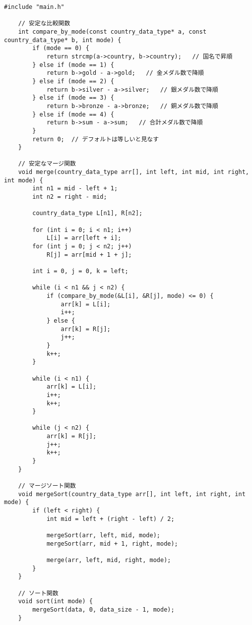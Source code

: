 \documentclass[a4paper,11pt]{jsarticle}
\begin{document}
\begin{lstlisting}[caption=sort関数のコード, label=sort]
    #include "main.h"

    // 安定な比較関数
    int compare_by_mode(const country_data_type* a, const country_data_type* b, int mode) {
        if (mode == 0) {
            return strcmp(a->country, b->country);   // 国名で昇順
        } else if (mode == 1) {
            return b->gold - a->gold;   // 金メダル数で降順
        } else if (mode == 2) {
            return b->silver - a->silver;   // 銀メダル数で降順
        } else if (mode == 3) {
            return b->bronze - a->bronze;   // 銅メダル数で降順
        } else if (mode == 4) {
            return b->sum - a->sum;   // 合計メダル数で降順
        }
        return 0;  // デフォルトは等しいと見なす
    }
    
    // 安定なマージ関数
    void merge(country_data_type arr[], int left, int mid, int right, int mode) {
        int n1 = mid - left + 1;
        int n2 = right - mid;
    
        country_data_type L[n1], R[n2];
    
        for (int i = 0; i < n1; i++)
            L[i] = arr[left + i];
        for (int j = 0; j < n2; j++)
            R[j] = arr[mid + 1 + j];
    
        int i = 0, j = 0, k = left;
    
        while (i < n1 && j < n2) {
            if (compare_by_mode(&L[i], &R[j], mode) <= 0) {
                arr[k] = L[i];
                i++;
            } else {
                arr[k] = R[j];
                j++;
            }
            k++;
        }
    
        while (i < n1) {
            arr[k] = L[i];
            i++;
            k++;
        }
    
        while (j < n2) {
            arr[k] = R[j];
            j++;
            k++;
        }
    }
    
    // マージソート関数
    void mergeSort(country_data_type arr[], int left, int right, int mode) {
        if (left < right) {
            int mid = left + (right - left) / 2;
    
            mergeSort(arr, left, mid, mode);
            mergeSort(arr, mid + 1, right, mode);
    
            merge(arr, left, mid, right, mode);
        }
    }
    
    // ソート関数
    void sort(int mode) {
        mergeSort(data, 0, data_size - 1, mode);
    }
\end{lstlisting}
\end{document}
